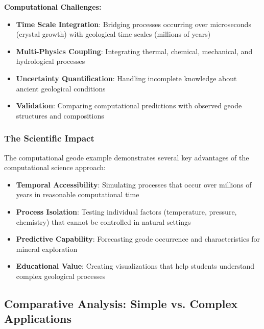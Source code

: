 \textbf{Computational Challenges:}
\begin{itemize}
    \item \textbf{Time Scale Integration}: Bridging processes occurring over microseconds (crystal growth) with geological time scales (millions of years)
    \item \textbf{Multi-Physics Coupling}: Integrating thermal, chemical, mechanical, and hydrological processes
    \item \textbf{Uncertainty Quantification}: Handling incomplete knowledge about ancient geological conditions
    \item \textbf{Validation}: Comparing computational predictions with observed geode structures and compositions
\end{itemize}

\subsubsection{The Scientific Impact}

The computational geode example demonstrates several key advantages of the computational science approach:

\begin{itemize}
    \item \textbf{Temporal Accessibility}: Simulating processes that occur over millions of years in reasonable computational time
    \item \textbf{Process Isolation}: Testing individual factors (temperature, pressure, chemistry) that cannot be controlled in natural settings
    \item \textbf{Predictive Capability}: Forecasting geode occurrence and characteristics for mineral exploration
    \item \textbf{Educational Value}: Creating visualizations that help students understand complex geological processes
\end{itemize}

\subsection{Comparative Analysis: Simple vs. Complex Applications}

